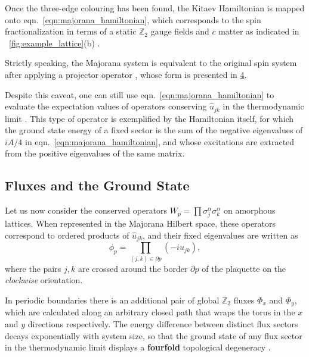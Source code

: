 Once the three-edge colouring has been found, the Kitaev Hamiltonian is
mapped onto
eqn.~\protect\hyperlink{eqn:majorana_hamiltonian}{{[}eqn:majorana\_hamiltonian{]}},
which corresponds to the spin fractionalization in terms of a static
\(\mathbb Z_2\) gauge fields and \(c\) matter as indicated in
~\protect\hyperlink{fig:example_lattice}{{[}fig:example\_lattice{]}}(b)
\autocite{Baskaran2007}.

Strictly speaking, the Majorana system is equivalent to the original
spin system after applying a projector operator
\autocite{pedrocchiPhysicalSolutionsKitaev2011,Zschocke_Physical_states2015,selfThermallyInducedMetallic2019},
whose form is presented in \protect\hyperlink{apx:projector}{4}.

Despite this caveat, one can still use
eqn.~\protect\hyperlink{eqn:majorana_hamiltonian}{{[}eqn:majorana\_hamiltonian{]}}
to evaluate the expectation values of operators conserving
\(\hat u_{jk}\) in the thermodynamic limit
\autocite{Yao2009,knolle_dynamics_2016}. This type of operator is
exemplified by the Hamiltonian itself, for which the ground state energy
of a fixed sector is the sum of the negative eigenvalues of \(iA/4\) in
eqn.~\protect\hyperlink{eqn:majorana_hamiltonian}{{[}eqn:majorana\_hamiltonian{]}},
and whose excitations are extracted from the positive eigenvalues of the
same matrix.

\hypertarget{fluxes-and-the-ground-state}{%
\subsection{Fluxes and the Ground
State}\label{fluxes-and-the-ground-state}}

Let us now consider the conserved operators
\(W_p = \prod \sigma_j^{\alpha}\sigma_k^{\alpha}\) on amorphous
lattices. When represented in the Majorana Hilbert space, these
operators correspond to ordered products of \(\hat u_{jk}\), and their
fixed eigenvalues are written as \[\label{eqn:flux_definition}
    \phi_p = \prod_{(j,k) \in \partial p} (-iu_{jk}),\] where the pairs
\(j,k\) are crossed around the border \(\partial p\) of the plaquette on
the \emph{clockwise} orientation.

In periodic boundaries there is an additional pair of global
\(\mathbb{Z}_2\) fluxes \(\Phi_x\) and \(\Phi_y\), which are calculated
along an arbitrary closed path that wraps the torus in the \(x\) and
\(y\) directions respectively. The energy difference between distinct
flux sectors decays exponentially with system size, so that the ground
state of any flux sector in the thermodynamic limit displays a
\textbf{fourfold} topological degeneracy
\autocite{kitaev_fault-tolerant_2003}.

